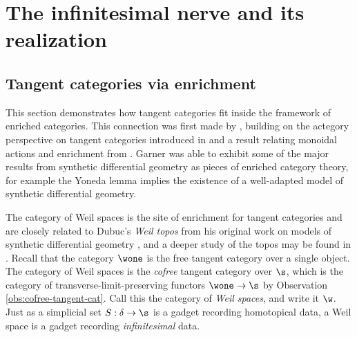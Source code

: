 \chapter{The infinitesimal nerve and its realization}%
\label{ch:inf-nerve-and-realization}




\section{Tangent categories via enrichment}%
\label{sec:tang-cats-enrichment}

This section demonstrates how tangent categories fit inside the framework of enriched categories. This connection  was first made by \cite{Garner2018}, building on the actegory perspective on tangent categories introduced in \cite{Leung2017} and a result relating monoidal actions and enrichment from \cite{Wood1978}. Garner was able to exhibit some of the major results from synthetic differential geometry as pieces of enriched category theory, for example the Yoneda lemma implies the existence of a well-adapted model of synthetic differential geometry.

The category of Weil spaces is the site of enrichment for tangent categories and are closely related to Dubuc's \emph{Weil topos} from his original work on models of synthetic differential geometry \cite{Dubuc1981}, and a deeper study of the topos may be found in \cite{Bertram2014}. Recall that the category $\wone$ is the free tangent category over a single object. The category of Weil spaces is the \emph{cofree} tangent category over $\s$, which is the category of transverse-limit-preserving functors $\wone \to \s$ by Observation \ref{obs:cofree-tangent-cat}. Call this the category of \emph{Weil spaces}, and write it $\w$. Just as a simplicial set $S: \delta \to \s$ is a gadget recording homotopical data, a Weil space is a gadget recording \emph{infinitesimal} data.

